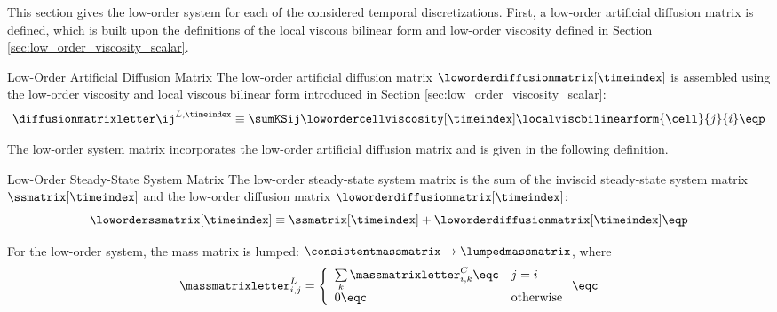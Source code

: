 This section gives the low-order system for each of the considered
temporal discretizations. First, a low-order artificial diffusion matrix
is defined, which is built upon the definitions of the local viscous bilinear
form and low-order viscosity defined in Section \eqref{sec:low_order_viscosity_scalar}.
\begin{definition}{Low-Order Artificial Diffusion Matrix}
   The low-order artificial diffusion matrix $\loworderdiffusionmatrix[\timeindex]$
   is assembled using the low-order viscosity and local viscous bilinear
   form introduced in Section \ref{sec:low_order_viscosity_scalar}:
   \begin{equation}\label{eq:low_order_diffusion_matrix}
     \diffusionmatrixletter\ij^{L,\timeindex} \equiv
       \sumKSij\lowordercellviscosity[\timeindex]
       \localviscbilinearform{\cell}{j}{i} \eqp
   \end{equation}
\end{definition}
The low-order system matrix incorporates the low-order artificial diffusion
matrix and is given in the following definition.
\begin{definition}{Low-Order Steady-State System Matrix}
   The low-order steady-state system matrix is the sum of the inviscid 
   steady-state system matrix $\ssmatrix[\timeindex]$ and the low-order diffusion
   matrix $\loworderdiffusionmatrix[\timeindex]$:
   \begin{equation}\label{eq:low_order_ss_matrix}
      \loworderssmatrix[\timeindex] \equiv
        \ssmatrix[\timeindex] + \loworderdiffusionmatrix[\timeindex] \eqp
   \end{equation}
\end{definition}
For the low-order system, the mass matrix is lumped:
$\consistentmassmatrix\rightarrow\lumpedmassmatrix$, where
\begin{equation}
  \massmatrixletter^L_{i,j} = \left\{\begin{array}{l l}
    \sum\limits_k \massmatrixletter^C_{i,k} \eqc & j = i\\
    0                                       \eqc & \mbox{otherwise}
    \end{array}\right.
    \eqc
\end{equation}
